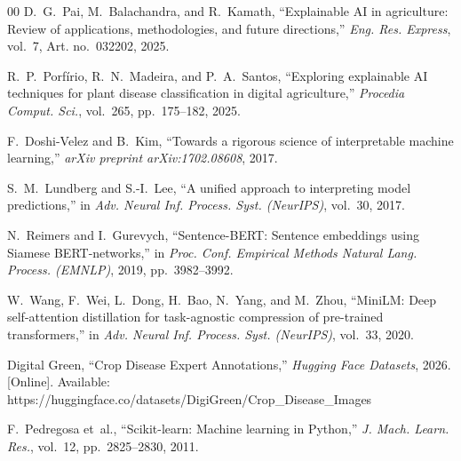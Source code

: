 \documentclass[conference]{IEEEtran}
\begin{document}
\begin{thebibliography}{00}
D.~G.~Pai, M.~Balachandra, and R.~Kamath, ``Explainable AI in agriculture: Review of applications, methodologies, and future directions,'' \textit{Eng. Res. Express}, vol.~7, Art. no.~032202, 2025.

R.~P.~Porf{\'i}rio, R.~N.~Madeira, and P.~A.~Santos, ``Exploring explainable AI techniques for plant disease classification in digital agriculture,'' \textit{Procedia Comput. Sci.}, vol.~265, pp.~175--182, 2025.

F.~Doshi-Velez and B.~Kim, ``Towards a rigorous science of interpretable machine learning,'' \textit{arXiv preprint arXiv:1702.08608}, 2017.

S.~M.~Lundberg and S.-I.~Lee, ``A unified approach to interpreting model predictions,'' in \textit{Adv. Neural Inf. Process. Syst. (NeurIPS)}, vol.~30, 2017.

N.~Reimers and I.~Gurevych, ``Sentence-BERT: Sentence embeddings using Siamese BERT-networks,'' in \textit{Proc. Conf. Empirical Methods Natural Lang. Process. (EMNLP)}, 2019, pp.~3982--3992.

W.~Wang, F.~Wei, L.~Dong, H.~Bao, N.~Yang, and M.~Zhou, ``MiniLM: Deep self-attention distillation for task-agnostic compression of pre-trained transformers,'' in \textit{Adv. Neural Inf. Process. Syst. (NeurIPS)}, vol.~33, 2020.

Digital Green, ``Crop Disease Expert Annotations,'' \textit{Hugging Face Datasets}, 2026. [Online]. Available: https://huggingface.co/datasets/DigiGreen/Crop\_Disease\_Images

F.~Pedregosa et~al., ``Scikit-learn: Machine learning in Python,'' \textit{J. Mach. Learn. Res.}, vol.~12, pp.~2825--2830, 2011.

\end{thebibliography}
\end{document}
